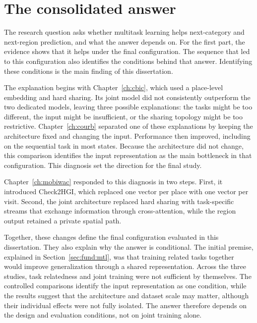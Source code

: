 \section{The consolidated answer}
\label{sec:conc:answer}

The research question asks whether multitask learning helps next-category and
next-region prediction, and what the answer depends on. For the first part, the evidence
shows that it helps under the final configuration. The sequence that led to this
configuration also identifies the conditions behind that answer. Identifying these
conditions is the main finding of this dissertation.

The explanation begins with Chapter~\ref{ch:cbic}, which used a place-level embedding and
hard sharing. Its joint model did not consistently outperform the two dedicated
models, leaving three possible explanations: the tasks might be too different, the input
might be insufficient, or the sharing topology might be too restrictive.
Chapter~\ref{ch:courb} separated one of these explanations by
keeping the architecture fixed and changing the input. Performance then improved,
including on the sequential task in most states. Because the architecture did not
change, this comparison identifies the input representation as the main bottleneck in
that configuration. This diagnosis set the direction for the final study.

Chapter~\ref{ch:mobiwac} responded to this diagnosis in two steps. First, it introduced
Check2HGI, which replaced one vector per place with one vector per visit. Second, the
joint architecture replaced hard sharing with task-specific streams that exchange
information through cross-attention, while the region output retained a private spatial
path.

Together, these changes define the final configuration evaluated in this dissertation.
They also explain why the answer is conditional. The initial premise, explained in
Section~\ref{sec:fund:mtl}, was that training related tasks together would improve
generalization through a shared representation. Across the three studies, task
relatedness and joint training were not sufficient by themselves.
The controlled comparisons identify the input representation as one condition,
while the results suggest that the architecture and dataset scale may matter, although their
individual effects were not fully isolated. The answer therefore depends on the design and
evaluation conditions, not on joint training alone.


